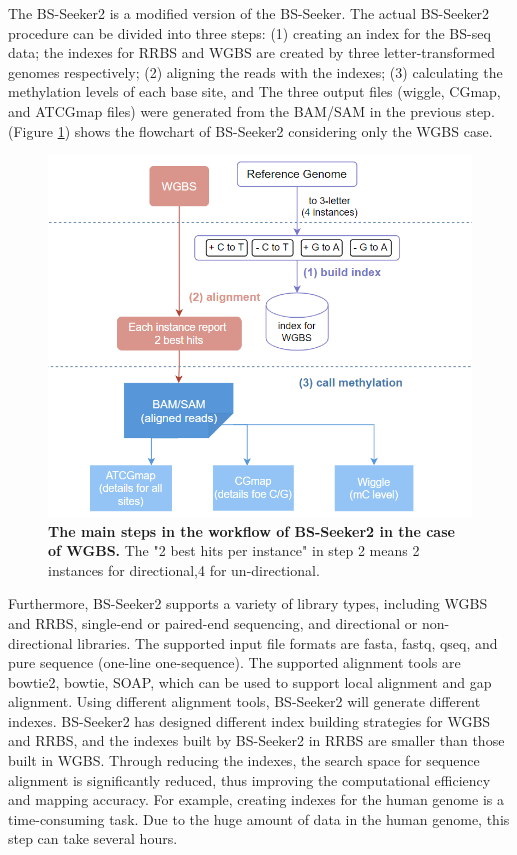 \documentclass{PHlab-thesis}
\begin{document}
\par
The BS-Seeker2 is a modified version of the BS-Seeker. The actual BS-Seeker2 procedure can be divided into three steps: (1) creating an index for the BS-seq data; the indexes for RRBS and WGBS are created by three letter-transformed genomes respectively; (2) aligning the reads with the indexes; (3) calculating the methylation levels of each base site, and The three output files (wiggle, CGmap, and ATCGmap files) were generated from the BAM/SAM in the previous step. (Figure \ref{f2}) shows the flowchart of BS-Seeker2 considering only the WGBS case\cite{guo2013bs}.

\begin{figure}[h!]
  \centering
  \includegraphics[scale=0.8]{figures/bs_seeker2_workflow.png}
  \caption{\textbf{The main steps in the workflow of BS-Seeker2 in the case of WGBS.}
  The "2 best hits per instance" in step 2 means 2 instances for directional,4 for un-directional.}
  \label{f2}
\end{figure}

\par
Furthermore, BS-Seeker2 supports a variety of library types, including WGBS and RRBS, single-end or paired-end sequencing, and directional or non-directional libraries. The supported input file formats are fasta, fastq, qseq, and pure sequence (one-line one-sequence). The supported alignment tools are bowtie2, bowtie, SOAP, which can be used to support local alignment and gap alignment. Using different alignment tools, BS-Seeker2 will generate different indexes. BS-Seeker2 has designed different index building strategies for WGBS and RRBS, and the indexes built by BS-Seeker2 in RRBS are smaller than those built in WGBS. Through reducing the indexes, the search space for sequence alignment is significantly reduced, thus improving the computational efficiency and mapping accuracy. For example, creating indexes for the human genome is a time-consuming task. Due to the huge amount of data in the human genome, this step can take several hours.
\end{document}
